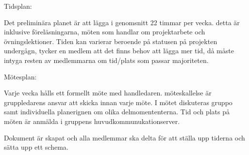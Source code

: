 \documentclass[a4paper]{article}
\begin{document}
Tidsplan:

Det preliminära planet är att lägga i genomsnitt 22 timmar per vecka. detta 
är inklusive föreläsningarna, möten som handlar om projektarbete och övningslektioner.
Tiden kan varierar beroende på statusen på projekten undergågn, tycker en medlem att
det finns behov att lägga mer tid, då måste intyga resten av medlemmarna om tid/plats som passar majoriteten.

Mötesplan:

Varje vecka hålls ett formellt möte med handledaren. möteskallelse är gruppledarens
ansvar att skicka innan varje möte. I mötet diskuteras gruppo samt individuella planerignen
om olika delmomententerna. Tid och plats på möten är anmälda i gruppens huvudkommunukationserver.

Dokument är skapat och alla medlemmar ska delta för att ställa upp tiderna och sätta upp ett schema.
\end{document}
